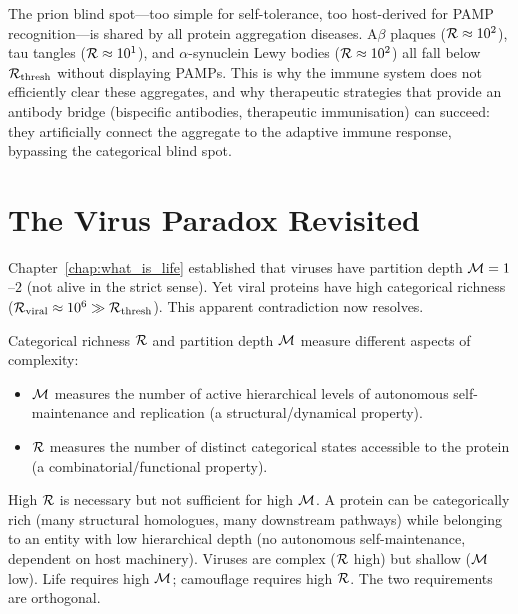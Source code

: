 \begin{remark}
The prion blind spot---too simple for self-tolerance, too host-derived for
PAMP recognition---is shared by all protein aggregation diseases. A$\beta$
plaques ($\mathcal{R} \approx 10^2$), tau tangles ($\mathcal{R} \approx 10^1$), and
$\alpha$-synuclein Lewy bodies ($\mathcal{R} \approx 10^2$) all fall below
$\mathcal{R}_{\mathrm{thresh}}$ without displaying PAMPs. This is why the immune
system does not efficiently clear these aggregates, and why therapeutic
strategies that provide an antibody bridge (bispecific antibodies, therapeutic
immunisation) can succeed: they artificially connect the aggregate to the
adaptive immune response, bypassing the categorical blind spot.
\end{remark}

\section{The Virus Paradox Revisited}
\label{sec:virus_paradox}

Chapter~\ref{chap:what_is_life} established that viruses have partition depth
$\mathcal{M} = 1$--$2$ (not alive in the strict sense). Yet viral proteins have
high categorical richness ($\mathcal{R}_{\mathrm{viral}} \approx 10^6 \gg \mathcal{R}_{\mathrm{thresh}}$).
This apparent contradiction now resolves.

\begin{proposition}
\label{prop:richness_vs_depth}
Categorical richness $\mathcal{R}$ and partition depth $\mathcal{M}$ measure different
aspects of complexity:
\begin{itemize}
  \item $\mathcal{M}$ measures the number of active hierarchical levels of
        autonomous self-maintenance and replication (a structural/dynamical property).
  \item $\mathcal{R}$ measures the number of distinct categorical states accessible
        to the protein (a combinatorial/functional property).
\end{itemize}
High $\mathcal{R}$ is necessary but not sufficient for high $\mathcal{M}$. A protein can
be categorically rich (many structural homologues, many downstream pathways)
while belonging to an entity with low hierarchical depth (no autonomous
self-maintenance, dependent on host machinery). Viruses are complex ($\mathcal{R}$
high) but shallow ($\mathcal{M}$ low). Life requires high $\mathcal{M}$; camouflage
requires high $\mathcal{R}$. The two requirements are orthogonal.
\end{proposition}

